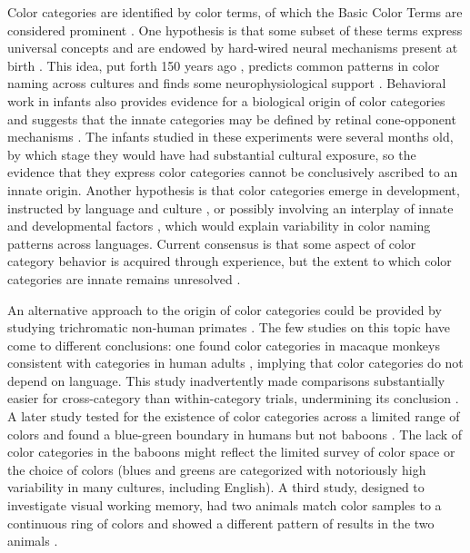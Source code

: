 Color categories are identified by color terms, of which the Basic Color Terms are considered prominent \citep{berlin_basic_1969}.
One hypothesis is that some subset of these terms express universal concepts \citep{heider_universals_1972,regier_focal_2005}
and are endowed by hard-wired neural mechanisms present at birth \citep{bornstein_categories_1976,lindsey_universality_2006}. 
This idea, put forth 150 years ago \citep{hering_zur_1875}, predicts common patterns in color naming across cultures \citep{baronchelli_modeling_2010,lindsey_hunter-gatherer_2015,abbott_focal_2016}
and finds some neurophysiological support \citep{clifford_electrophysiological_2009,yang_cortical_2016}. 
Behavioral work in infants also provides evidence for a biological origin of color categories \citep{franklin_new_2004,ozturk_language_2013} and suggests that the innate categories may be defined by retinal cone-opponent mechanisms \citep{skelton_biological_2017}.
The infants studied in these experiments were several months old, by which stage they would have had substantial cultural exposure, so the evidence that they express color categories cannot be conclusively ascribed to an innate origin. Another hypothesis is that color categories emerge in development, instructed by language and culture \citep{davidoff_colour_1999,roberson_color_2005}, or possibly involving an interplay of innate and developmental factors \citep{webster_variations_2002,kay_language_2006,franklin_lateralization_2008,regier_language_2009,paramei_online_2018}, which would explain variability in color naming patterns across languages. Current consensus is that some aspect of color category behavior is acquired through experience, but the extent to which color categories are innate remains unresolved \citep{davidoff_nature_2009,RN18696}.

An alternative approach to the origin of color categories could be provided by studying trichromatic non-human primates \citep{siuda-krzywicka_biological_2019}. 
The few studies on this topic have come to different conclusions: one found color categories in macaque monkeys consistent with categories in human adults \citep{sandell_color_1979}, implying that color categories do not depend on language.
This study inadvertently made comparisons substantially easier for cross-category than within-category trials, undermining its conclusion \citep{davidoff_cross-species_2010}. 
A later study tested for the existence of color categories across a limited range of colors and found a blue-green boundary in humans but not baboons \citep{fagot_cross-species_2006}. The lack of color categories in the baboons might reflect the limited survey of color space or the choice of colors (blues and greens are categorized with notoriously high variability in many cultures, including English). A third study, designed to investigate visual working memory, had two animals match color samples to a continuous ring of colors and showed a different pattern of results in the two animals \citep{panichello_error-correcting_2019}.

